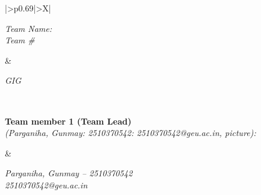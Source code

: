 \documentclass[11pt,a4paper]{article}
\begin{document}
\begin{tabularx}{\textwidth}{|>{\RaggedRight\arraybackslash}p{0.69\textwidth}|>{\RaggedRight\arraybackslash}X|}

\hline

\begin{minipage}[t]{\linewidth}

\vspace{1.5mm}

\textit{Team Name:}\\[-1mm]

\textit{Team \#}

\vspace{1.5mm}

\end{minipage}

&

\begin{minipage}[t]{\linewidth}

\vspace{1.5mm}

\textit{GIG}

\vspace{1.5mm}

\end{minipage}

\\

\hline

\begin{minipage}[t][3.25cm][t]{\linewidth}

\vspace{1.5mm}

\textbf{Team member 1 (Team Lead)}\\[-1mm]

\textit{(Parganiha, Gunmay: 2510370542: 2510370542@geu.ac.in, picture):}

\vspace{2.0cm}

\end{minipage}

&

\begin{minipage}[t][3.25cm][t]{\linewidth}

\vspace{1.5mm}

\textit{Parganiha, Gunmay -- 2510370542}\\

\textit{2510370542@geu.ac.in}

\vspace{2mm}


\end{minipage}
\end{tabularx}
\end{document}
